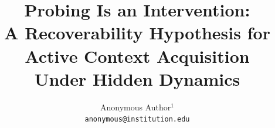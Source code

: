\documentclass{article}
\title{Probing Is an Intervention:\\A Recoverability Hypothesis for Active Context Acquisition\\Under Hidden Dynamics}
\author{%
  Anonymous Author$^1$ \\ \texttt{anonymous@institution.edu}
}
\begin{document}
\maketitle

\begin{abstract}

\end{abstract}











\newpage
\appendix


\newpage

\end{document}
